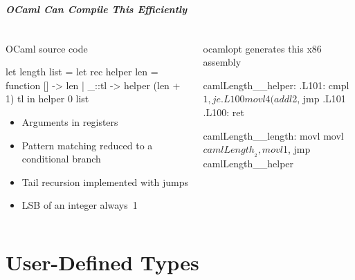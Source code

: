 \documentclass{plt}
\begin{document}
\begin{frame}[fragile]
  \frametitle{OCaml Can Compile This Efficiently}


  \begin{columns}
    \begin{column}[t]{0.6\textwidth}

OCaml source code

\medskip

\begin{ocaml}
let length list =
  let rec helper len = function
      []    -> len
    | _::tl -> helper (len + 1) tl
  in helper 0 list
\end{ocaml}

\begin{itemize}
\item Arguments in registers
\item Pattern matching reduced to a conditional branch
\item Tail recursion implemented with jumps
\item LSB of an integer always~1
\end{itemize}

    \end{column}
    \begin{column}[t]{0.4\textwidth}
ocamlopt generates this x86 assembly

\medskip

\begin{interactive}
\color{black}camlLength__helper:
.L101:
  cmpl  $1, %
  je    .L100
  movl  4(%
  addl  $2, %
  jmp   .L101
.L100:
  ret

camlLength__length:
  movl  %
  movl  $camlLength__2, %
  movl  $1, %
  jmp   camlLength__helper
\end{interactive}    
    \end{column}
  \end{columns}

\end{frame}

\part{User-Defined Types}
\end{document}
